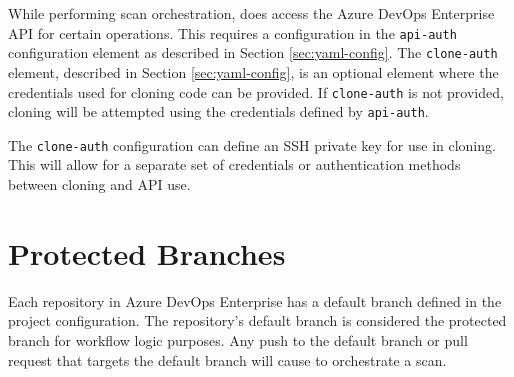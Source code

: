 While performing scan orchestration, \cxoneflow does access the Azure DevOps Enterprise API for
certain operations.  This requires a configuration in the \texttt{api-auth} configuration
element as described in Section \ref{sec:yaml-config}.  The \texttt{clone-auth} element,
described in Section \ref{sec:yaml-config}, is an optional element where the credentials
used for cloning code can be provided.  If \texttt{clone-auth} is not provided, cloning will
be attempted using the credentials defined by \texttt{api-auth}.

The \texttt{clone-auth} configuration can define an SSH private key for use in cloning.  This
will allow for a separate set of credentials or authentication methods between cloning and
API use.

\section{Protected Branches}

Each repository in Azure DevOps Enterprise has a default branch defined in the project
configuration.  The repository's default branch is considered the protected branch for
workflow logic purposes.  Any push to the default branch or pull request that targets
the default branch will cause \cxoneflow to orchestrate a scan.
